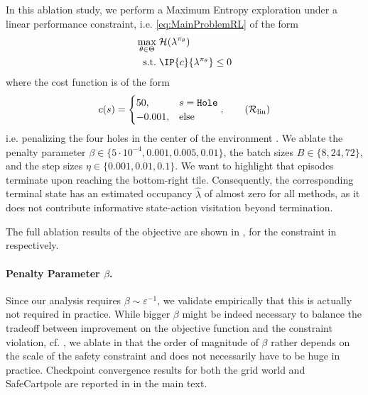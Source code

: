 \documentclass{article}
\theoremstyle{plain}
\theoremstyle{definition}
\theoremstyle{remark}
\def\epsilon{{\varepsilon}}
\def\lambdaHat{{\widehat{\lambda}}}
\def\ss{{s}}
\def\HH{{\mathcal{H}}}
\def\ss{{s}}
\def\Reg{{\mathcal{R}}}
\begin{document}
In this ablation study, we perform a Maximum Entropy exploration under a
linear performance constraint, i.e. \eqref{eq:MainProblemRL} of the form
\begin{align*}
 \max_{\theta\in\Theta} & \; \HH(\lambda^{\pi_\theta})           \\
 \text{s.t.}            & \; \IP{c}{\lambda^{\pi_\theta}} \leq 0
\end{align*}
where the cost function is of the form
\begin{align}
 c(\ss) = \begin{cases}
           50,     & \ss = \texttt{Hole} \\
           -0.001, & \text{else}
          \end{cases},
 \tag{$\Reg_{\mathrm{lin}}$}
 \label{eq:AppendixCostFuncLinearPerformanceConstraint}
\end{align}
i.e. penalizing the four holes in the center of the environment .
We ablate the penalty parameter $\beta \in \{5\cdot 10^{-4}, 0.001, 0.005, 0.01\}$, the batch sizes $B \in \{8,
 24, 72\}$, and the step sizes $\eta \in \{0.001, 0.01, 0.1\}$.
We want to highlight that episodes terminate upon reaching the bottom-right
tile. Consequently, the corresponding terminal state has an estimated
occupancy $\lambdaHat$ of almost zero for all methods, as it does not contribute
informative state-action visitation beyond termination.

The full ablation results of the objective are shown in
, for the
constraint in 
respectively.

\paragraph{Penalty Parameter $\beta$.}
Since our analysis requires $\beta \sim \epsilon^{-1}$, we validate
empirically that this is actually not required in practice. While bigger
$\beta$ might be indeed necessary to balance the tradeoff between
improvement on the objective function and the constraint violation, cf.
, we ablate in
 that the order of magnitude
of $\beta$ rather depends on the scale of the safety constraint and does
not necessarily have to be huge in practice. {Checkpoint convergence
  results for both the grid world and SafeCartpole are reported in
   in the main text.}
\end{document}
